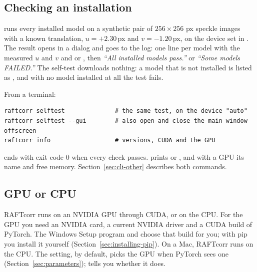 \subsection{Checking an installation}
\label{sec:installing-check}

 runs every installed model on a synthetic pair of $256 \times 256$ px
speckle images with a known translation, $u = +2.30$\,px and $v = -1.20$\,px, on the device set
in . The result opens in a dialog and goes to the log: one line per model with the
measured $u$ and $v$ and  or , then \emph{``All installed models pass.''} or
\emph{``Some models FAILED.''} The self-test downloads nothing: a model that is not installed is
listed as , and with no model installed at all the test fails.

From a terminal:

\begin{lstlisting}
raftcorr selftest              # the same test, on the device "auto"
raftcorr selftest --gui        # also open and close the main window offscreen
raftcorr info                  # versions, CUDA and the GPU
\end{lstlisting}

 ends with exit code 0 when every check passes. 
prints  or , and with a GPU its name and free memory.
Section~\ref{sec:cli-other} describes both commands.

\subsection{GPU or CPU}
\label{sec:installing-gpu}

RAFTcorr runs on an NVIDIA GPU through CUDA, or on the CPU. For the GPU you need an NVIDIA card,
a current NVIDIA driver and a CUDA build of PyTorch. The Windows Setup program and
 choose that build for you; with pip you install it yourself
(Section~\ref{sec:installing-pip}). On a Mac, RAFTcorr runs on the CPU. The  setting,
 by default, picks the GPU when PyTorch sees one (Section~\ref{sec:parameters});
 tells you whether it does.
